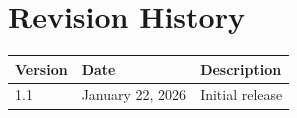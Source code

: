 \documentclass[11pt,letterpaper]{article}
\begin{document}
\section{Revision History}

\begin{tabularx}{\textwidth}{llX}
\toprule
\textbf{Version} & \textbf{Date} & \textbf{Description} \\
\midrule
1.1 & January 22, 2026 & Initial release \\
\bottomrule
\end{tabularx}
\end{document}
